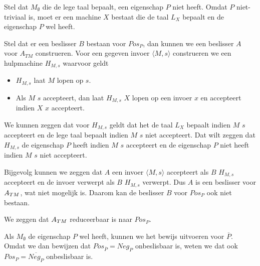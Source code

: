   Stel dat $M_\emptyset$ die de lege taal bepaalt, een eigenschap $P$ niet heeft. Omdat $P$ niet-triviaal is, moet er een machine $X$ bestaat die de taal $L_X$ bepaalt en de eigenschap $P$ wel heeft.

  Stel dat er een beslisser $B$ bestaan voor $Pos_P$, dan kunnen we een beslisser $A$ voor $A_{TM}$ construeren. Voor een gegeven invoer $\langle M,s \rangle$ construeren we een hulpmachine $H_{M,s}$ waarvoor geldt
  \begin{itemize}
  \item $H_{M,s}$ laat $M$ lopen op $s$.
  \item Als $M$ $s$ accepteert, dan laat $H_{M,s}$ $X$ lopen op een invoer $x$ en accepteert indien $X$ $x$ accepteert.
  \end{itemize}
  
  We kunnen zeggen dat voor $H_{M,s}$ geldt dat het de taal $L_X$ bepaalt indien $M$ $s$ accepteert en de lege taal bepaalt indien $M$ $s$ niet accepteert. Dat wilt zeggen dat $H_{M,s}$ de eigenschap $P$ heeft indien $M$ $s$ accepteert en de eigenschap $P$ niet heeft indien $M$ $s$ niet accepteert.
  
  Bijgevolg kunnen we zeggen dat $A$ een invoer $\langle M,s \rangle$ accepteert als $B$ $H_{M,s}$ accepteert en de invoer verwerpt als $B$ $H_{M,s}$ verwerpt. Dus $A$ is een beslisser voor ${A_{TM}}$, wat niet mogelijk is. Daarom kan de beslisser $B$ voor $Pos_P$ ook niet bestaan.
  
  We zeggen dat ${A_{TM}}$ reduceerbaar is naar $Pos_P$.
  
  Als $M_\emptyset$ de eigenschap $P$ wel heeft, kunnen we het bewijs uitvoeren voor $\overline{P}$. Omdat we dan bewijzen dat $Pos_{\overline{P}} = Neg_P$ onbeslisbaar is, weten we dat ook $Pos_P = \overline{Neg_P}$ onbeslisbaar is.